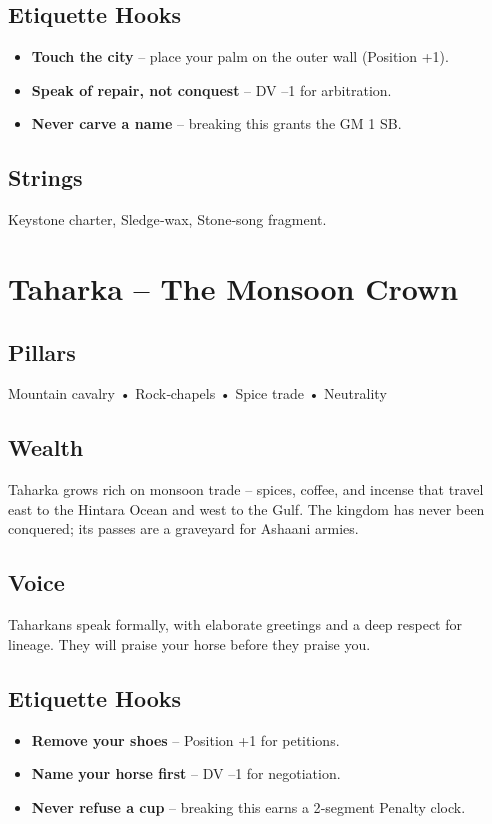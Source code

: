 \documentclass[11pt]{book}
\begin{document}
\subsection*{Etiquette Hooks}
\begin{itemize}
\item \textbf{Touch the city} -- place your palm on the outer wall (Position +1).
\item \textbf{Speak of repair, not conquest} -- DV --1 for arbitration.
\item \textbf{Never carve a name} -- breaking this grants the GM 1 SB.
\end{itemize}

\subsection*{Strings}
Keystone charter, Sledge‑wax, Stone‑song fragment.

\section{Taharka -- The Monsoon Crown}

\subsection*{Pillars}
Mountain cavalry • Rock‑chapels • Spice trade • Neutrality

\subsection*{Wealth}
Taharka grows rich on monsoon trade -- spices, coffee, and incense that travel east to the Hintara Ocean and west to the Gulf. The kingdom has never been conquered; its passes are a graveyard for Ashaani armies.

\subsection*{Voice}
Taharkans speak formally, with elaborate greetings and a deep respect for lineage. They will praise your horse before they praise you.

\subsection*{Etiquette Hooks}
\begin{itemize}
\item \textbf{Remove your shoes} -- Position +1 for petitions.
\item \textbf{Name your horse first} -- DV --1 for negotiation.
\item \textbf{Never refuse a cup} -- breaking this earns a 2‑segment Penalty clock.
\end{itemize}
\end{document}
